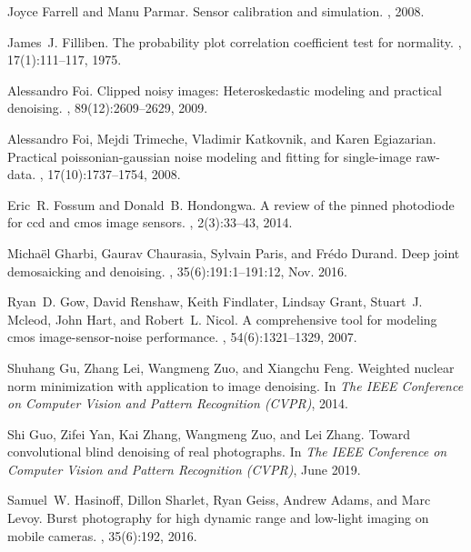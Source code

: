 \documentclass[10pt,twocolumn,letterpaper]{article}
\begin{document}
\begin{thebibliography}{10}
Joyce Farrell and Manu Parmar.
\newblock Sensor calibration and simulation.
, 2008.

James~J. Filliben.
\newblock The probability plot correlation coefficient test for normality.
, 17(1):111--117, 1975.

Alessandro Foi.
\newblock Clipped noisy images: Heteroskedastic modeling and practical
  denoising.
, 89(12):2609--2629, 2009.

Alessandro Foi, Mejdi Trimeche, Vladimir Katkovnik, and Karen Egiazarian.
\newblock Practical poissonian-gaussian noise modeling and fitting for
  single-image raw-data.
, 17(10):1737--1754, 2008.

Eric~R. Fossum and Donald~B. Hondongwa.
\newblock A review of the pinned photodiode for ccd and cmos image sensors.
, 2(3):33--43,
  2014.

Micha\"{e}l Gharbi, Gaurav Chaurasia, Sylvain Paris, and Fr{\'e}do Durand.
\newblock Deep joint demosaicking and denoising.
, 35(6):191:1--191:12, Nov. 2016.

Ryan~D. Gow, David Renshaw, Keith Findlater, Lindsay Grant, Stuart~J. Mcleod,
  John Hart, and Robert~L. Nicol.
\newblock A comprehensive tool for modeling cmos image-sensor-noise
  performance.
, 54(6):1321--1329, 2007.

Shuhang Gu, Zhang Lei, Wangmeng Zuo, and Xiangchu Feng.
\newblock Weighted nuclear norm minimization with application to image
  denoising.
\newblock In {\em The IEEE Conference on Computer Vision and Pattern
  Recognition (CVPR)}, 2014.

Shi Guo, Zifei Yan, Kai Zhang, Wangmeng Zuo, and Lei Zhang.
\newblock Toward convolutional blind denoising of real photographs.
\newblock In {\em The IEEE Conference on Computer Vision and Pattern
  Recognition (CVPR)}, June 2019.

Samuel~W. Hasinoff, Dillon Sharlet, Ryan Geiss, Andrew Adams, and Marc Levoy.
\newblock Burst photography for high dynamic range and low-light imaging on
  mobile cameras.
, 35(6):192, 2016.


\end{thebibliography}
\end{document}
